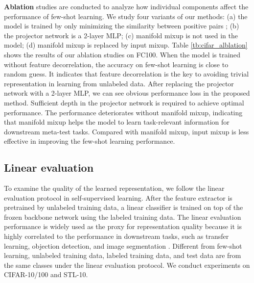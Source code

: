 \documentclass{article}
\begin{document}
\textbf{Ablation} studies are conducted to analyze how individual components affect the performance of few-shot learning. We study four variants of our methods: (a) the model is trained by only minimizing the similarity between positive pairs ; (b) the projector network is a 2-layer MLP; (c) manifold mixup is not used in the model; (d) manifold mixup is replaced by input mixup. Table \ref{tb:cifar_alblation} shows the results of our ablation studies on FC100. When the model is trained without feature decorrelation, the accuracy on few-shot learning is close to random guess. It indicates that feature decorrelation is the key to avoiding trivial representation in learning from unlabeled data. After replacing the projector network with a 2-layer MLP, we can see obvious performance loss in the proposed method. Sufficient depth in the projector network is required to achieve optimal performance. The performance deteriorates without manifold mixup, indicating that manifold mixup helps the model to learn task-relevant information for downstream meta-test tasks. Compared with manifold mixup, input mixup is less effective in improving the few-shot learning performance.

\begin{table}[!ht]
    \renewcommand\arraystretch{1.3}
\centering
    \caption{Ablation studies on FC100.}
 \label{tb:cifar_alblation}
\end{table}

\subsection{Linear evaluation}
To examine the quality of the learned representation, we follow the linear evaluation protocol in self-supervised learning.  After the feature extractor is pretrained by unlabeled training data, a linear classifier is trained on top of the frozen backbone network using the labeled training data. The linear evaluation performance is widely used as the proxy for representation quality because it is highly correlated to the performance in downstream tasks, such as transfer learning, objection detection, and image segmentation \citep{he:etal:2020moco,chen:he2021simsiam}. Different from few-shot learning, unlabeled training data, labeled training data, and test data are from the same classes under the linear evaluation protocol.  We conduct experiments on CIFAR-10/100 and STL-10.
\end{document}
